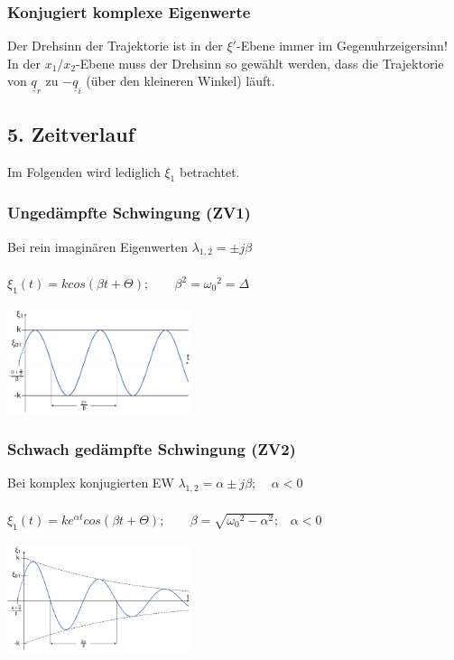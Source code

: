 \documentclass[a4paper,twocolumn,10pt]{article}
\begin{document}
\subsubsection*{Konjugiert komplexe Eigenwerte}
Der Drehsinn der Trajektorie ist in der $\xi'$-Ebene immer im Gegenuhrzeigersinn!\\
In der $x_1/x_2$-Ebene muss der Drehsinn so gewählt werden, dass die Trajektorie von $\underline{q}_r$ zu $-\underline{q}_i$ (über den kleineren Winkel) läuft.

\subsection*{5. Zeitverlauf}
Im Folgenden wird lediglich $\xi_1$ betrachtet.
\subsubsection*{Ungedämpfte Schwingung (ZV1)}
Bei rein imaginären Eigenwerten $\lambda_{1,2}=\pm j\beta$\\\\
$\xi_1(t)=k cos(\beta t+\Theta);\;\;\;\;\;\;\;\beta^2={\omega_0}^2=\Delta$\\\\
\includegraphics[width=0.4\textwidth]{Grafiken/Zustandsvariablen_Zeitverlauf1}

\subsubsection*{Schwach gedämpfte Schwingung (ZV2)}
Bei komplex konjugierten EW $\lambda_{1,2}=\alpha\pm j\beta;\;\;\;\;\alpha<0$\\\\
$\xi_1(t)=ke^{\alpha t}cos(\beta t+\Theta);\;\;\;\;\;\;\;\beta =\sqrt{{\omega_0}^2-\alpha^2};\;\;\;\alpha<0$\\\\
\includegraphics[width=0.4\textwidth]{Grafiken/Zustandsvariablen_Zeitverlauf2}
\end{document}
